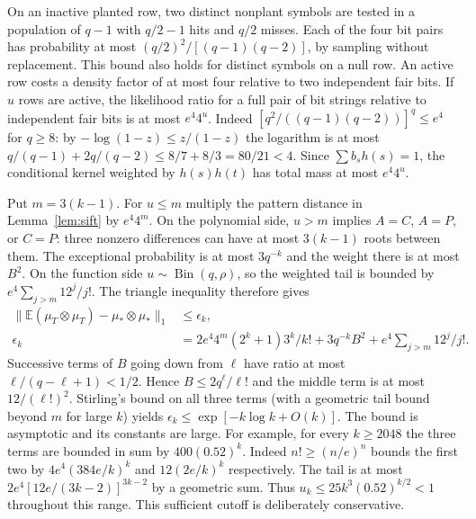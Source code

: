 \documentclass[11pt]{article}
\newcommand{\E}{\mathbb E}
\newcommand{\Bin}{\operatorname{Bin}}
\begin{document}
On an inactive planted row, two distinct nonplant symbols are tested in a population of $q-1$ with $q/2-1$ hits and $q/2$ misses. Each of the four bit pairs has probability at most $(q/2)^2/[(q-1)(q-2)]$, by sampling without replacement. This bound also holds for distinct symbols on a null row. An active row costs a density factor of at most four relative to two independent fair bits. If $u$ rows are active, the likelihood ratio for a full pair of bit strings relative to independent fair bits is at most $e^4 4^u$. Indeed $[q^2/((q-1)(q-2))]^q\le e^4$ for $q\ge8$: by $-\log(1-z)\le z/(1-z)$ the logarithm is at most $q/(q-1)+2q/(q-2)\le 8/7+8/3=80/21<4$. Since $\sum b_s h(s)=1$, the conditional kernel weighted by $h(s)h(t)$ has total mass at most $e^4 4^u$.

Put $m=3(k-1)$. For $u\le m$ multiply the pattern distance in Lemma~\ref{lem:sift} by $e^4 4^m$. On the polynomial side, $u>m$ implies $A=C$, $A=P$, or $C=P$: three nonzero differences can have at most $3(k-1)$ roots between them. The exceptional probability is at most $3q^{-k}$ and the weight there is at most $B^2$. On the function side $u\sim\Bin(q,\rho)$, so the weighted tail is bounded by $e^4\sum_{j>m}12^j/j!$. The triangle inequality therefore gives
\begin{align}
 \|\E(\mu_T\otimes\mu_T)-\mu_*\otimes\mu_*\|_1
 &\le \epsilon_k,\nonumber\\
 \epsilon_k&=2e^4 4^m(2^k+1)3^k/k!
       +3q^{-k}B^2+e^4\sum_{j>m}12^j/j! .\label{eq:eps}
\end{align}
Successive terms of $B$ going down from $\ell$ have ratio at most $\ell/(q-\ell+1)<1/2$. Hence $B\le2q^\ell/\ell!$ and the middle term is at most $12/(\ell!)^2$. Stirling's bound on all three terms (with a geometric tail bound beyond $m$ for large $k$) yields $\epsilon_k\le\exp[-k\log k+O(k)]$. The bound is asymptotic and its constants are large. For example, for every $k\ge2048$ the three terms are bounded in sum by $400(0.52)^k$. Indeed $n!\ge(n/e)^n$ bounds the first two by $4e^4(384e/k)^k$ and $12(2e/k)^k$ respectively. The tail is at most $2e^4[12e/(3k-2)]^{3k-2}$ by a geometric sum. Thus $u_k\le25 k^3(0.52)^{k/2}<1$ throughout this range. This sufficient cutoff is deliberately conservative.
\end{document}
